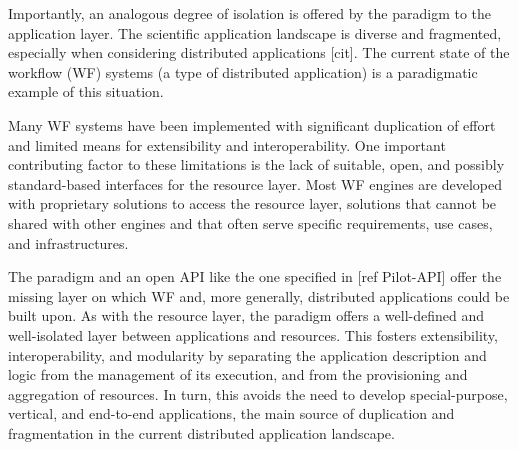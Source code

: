 \documentclass{sig-alternate}
\begin{document}



Importantly, an analogous degree of isolation is offered by the \pilot paradigm
to the application layer. The scientific application landscape is diverse and
fragmented, especially when considering distributed applications [cit]. The
current state of the workflow (WF) systems (a type of distributed application)
is a paradigmatic example of this situation.

Many WF systems have been implemented with significant duplication of effort and
limited means for extensibility and interoperability. One important contributing
factor to these limitations is the lack of suitable, open, and possibly
standard-based interfaces for the resource layer. Most WF engines are developed
with proprietary solutions to access the resource layer, solutions that cannot
be shared with other engines and that often serve specific requirements, use
cases, and infrastructures.

The \pilot paradigm and an open \pilot API like the one specified in [ref
Pilot-API] offer the missing layer on which WF and, more generally, distributed
applications could be built upon. As with the resource layer, the \pilot
paradigm offers a well-defined and well-isolated layer between applications and
resources. This fosters extensibility, interoperability, and modularity by
separating the application description and logic from the management of its
execution, and from the provisioning and aggregation of resources. In turn,
this avoids the need to develop special-purpose, vertical, and end-to-end
applications, the main source of duplication and fragmentation in the current
distributed application landscape.
\end{document}
